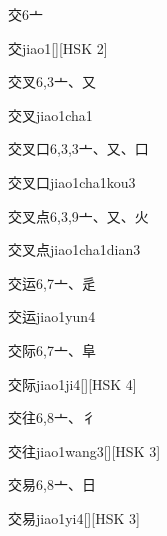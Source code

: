 \begin{entry}{交}{6}{⼇}
  \begin{phonetics}{交}{jiao1}[][HSK 2]
  \end{phonetics}
\end{entry}

\begin{entry}{交叉}{6,3}{⼇、⼜}
  \begin{phonetics}{交叉}{jiao1cha1}
  \end{phonetics}
\end{entry}

\begin{entry}{交叉口}{6,3,3}{⼇、⼜、⼝}
  \begin{phonetics}{交叉口}{jiao1cha1kou3}
  \end{phonetics}
\end{entry}

\begin{entry}{交叉点}{6,3,9}{⼇、⼜、⽕}
  \begin{phonetics}{交叉点}{jiao1cha1dian3}
  \end{phonetics}
\end{entry}

\begin{entry}{交运}{6,7}{⼇、⾡}
  \begin{phonetics}{交运}{jiao1yun4}
  \end{phonetics}
\end{entry}

\begin{entry}{交际}{6,7}{⼇、⾩}
  \begin{phonetics}{交际}{jiao1ji4}[][HSK 4]
  \end{phonetics}
\end{entry}

\begin{entry}{交往}{6,8}{⼇、⼻}
  \begin{phonetics}{交往}{jiao1wang3}[][HSK 3]
  \end{phonetics}
\end{entry}

\begin{entry}{交易}{6,8}{⼇、⽇}
  \begin{phonetics}{交易}{jiao1yi4}[][HSK 3]
  \end{phonetics}
\end{entry}

